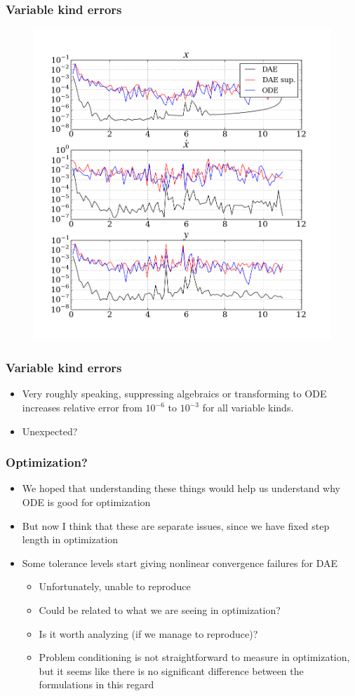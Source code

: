 \documentclass[]{beamer}
\begin{document}
\begin{frame}
\frametitle{Variable kind errors}
\begin{figure}[ht]
\centering
\includegraphics[width=0.73\linewidth]{errors2.png}
\end{figure}
\end{frame}

\begin{frame}
\frametitle{Variable kind errors}
\begin{itemize}
\item
Very roughly speaking, suppressing algebraics or transforming to ODE increases relative error from $10^{-6}$ to $10^{-3}$ for all variable kinds.
\item
Unexpected?
\end{itemize}
\end{frame}

\begin{frame}
\frametitle{Optimization?}
\begin{itemize}
\item
We hoped that understanding these things would help us understand why ODE is good for optimization
\item
But now I think that these are separate issues, since we have fixed step length in optimization
\item
Some tolerance levels start giving nonlinear convergence failures for DAE
\begin{itemize}
\item
Unfortunately, unable to reproduce
\item
Could be related to what we are seeing in optimization?
\item
Is it worth analyzing (if we manage to reproduce)?
\item
Problem conditioning is not straightforward to measure in optimization, but it seems like there is no significant difference between the formulations in this regard
\end{itemize}
\end{itemize}
\end{frame}
\end{document}
